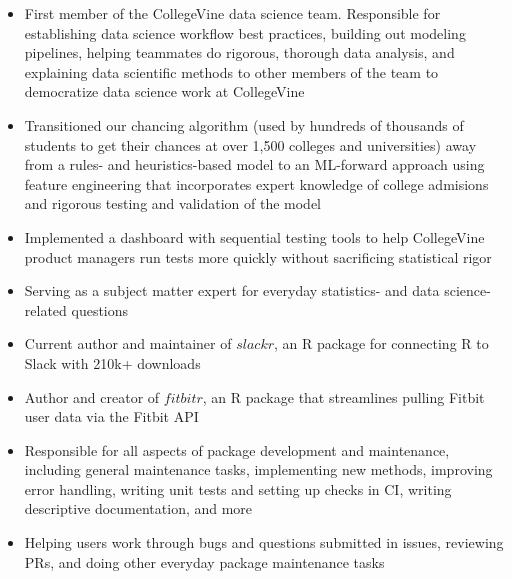 \documentclass[10pt,a4paper,ragged2e,withhyper]{/Users/matt/documents/GitHub/mrkaye97.github.io/resume/altacv}
\begin{document}
	\begin{paracol}{2}
	
		\begin{itemize}
		\item First member of the CollegeVine data science team. Responsible for establishing data science workflow best practices, building out modeling pipelines, helping teammates do rigorous, thorough data analysis, and explaining data scientific methods to other members of the team to democratize data science work at CollegeVine
		\item Transitioned our chancing algorithm (used by hundreds of thousands of students to get their chances at over 1,500 colleges and universities) away from a rules- and heuristics-based model to an ML-forward approach using feature engineering that incorporates expert knowledge of college admisions and rigorous testing and validation of the model
		\item Implemented a dashboard with sequential testing tools to help CollegeVine product managers run tests more quickly without sacrificing statistical rigor
		\item Serving as a subject matter expert for everyday statistics- and data science-related questions
		\end{itemize}
		
		\divider
		
		
		\begin{itemize}
		\item Current author and maintainer of $slackr$, an R package for connecting R to Slack with 210k+ downloads
		\item Author and creator of $fitbitr$, an R package that streamlines pulling Fitbit user data via the Fitbit API
		\item Responsible for all aspects of package development and maintenance, including general maintenance tasks, implementing new methods, improving error handling, writing unit tests and setting up checks in CI, writing descriptive documentation, and more
		\item Helping users work through bugs and questions submitted in issues, reviewing PRs, and doing other everyday package maintenance tasks
		\end{itemize}
		

\end{paracol}
\end{document}
